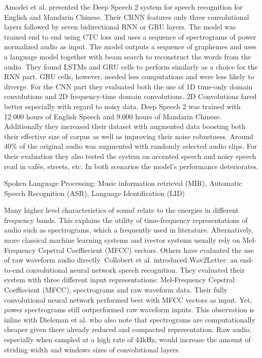 Amodei et al. presented the Deep Speech 2 system for speech recognition for English and Mandarin Chinese. Their CRNN features only three convolutional layers followed by seven bidirectional RNN or GRU layers. The model was trained end to end using CTC loss and uses a sequence of spectrograms of power normalized audio as input. The model outputs a sequence of graphemes and uses a language model together with beam search to reconstruct the words from the audio. They found LSTMs and GRU cells to perform similarly as a choice for the RNN part. GRU cells, however, needed less computations and were less likely to diverge. For the CNN part they evaluated both the use of 1D time-only domain convolutions and 2D frequency-time domain convolutions. 2D Convolutions fared better especially with regard to noisy data. 
Deep Speech 2 was trained with 12.000 hours of English Speech and 9.000 hours of Mandarin Chinese. Additionally they increased their dataset with augmented data boosting both their effective size of corpus as well as improving their noise robustness. Around 40\% of the original audio was augmented with randomly selected audio clips. For their evaluation they also tested the system on accented speech and noisy speech read in cafés, streets, etc. In both scenarios the model's performance deteriorates.



Spoken Language Processing:
Music information retrieval (MIR), Automatic Speech Recognition (ASR), Language Identification (LID)

Many higher level characteristics of sound relate to the energies in different frequency bands. This explains the utility of time-frequency representations of audio such as spectrograms, which a frequently used in literature.\cite{montavon2009deep, dieleman2013, multiscalelee2009unsupervised, wulfing2012unsupervised, henaff2011unsupervised} Alternatively, more classical machine learning systems and ivector systems usually rely on Mel-Frequency Cepstral Coeffiecient (MFCC) vectors. \cite{} Others have evaluated the use of raw waveform audio directly.\cite{dieleman2014end, collobert2016wav2letter}
Collobert et al. introduced Wav2Letter\cite{collobert2016wav2letter}: an end-to-end convolutional neural network speech recognition. They evaluated their system with three different input representations: Mel-Frequency Cepstral Coeffiecient (MFCC), spectrograms and raw waveform data. Their fully convolutional neural network performed best with MFCC vectors as input. Yet, power spectrograms still outperformed raw waveform inputs. This observation is inline with Dieleman et al.\cite{dieleman2014end} who also note that spectrograms are computationally cheaper given there already reduced and compacted representation. Raw audio, especially when sampled at a high rate of 44kHz, would increase the amount of striding width and windows sizes of convolutional layers.       



